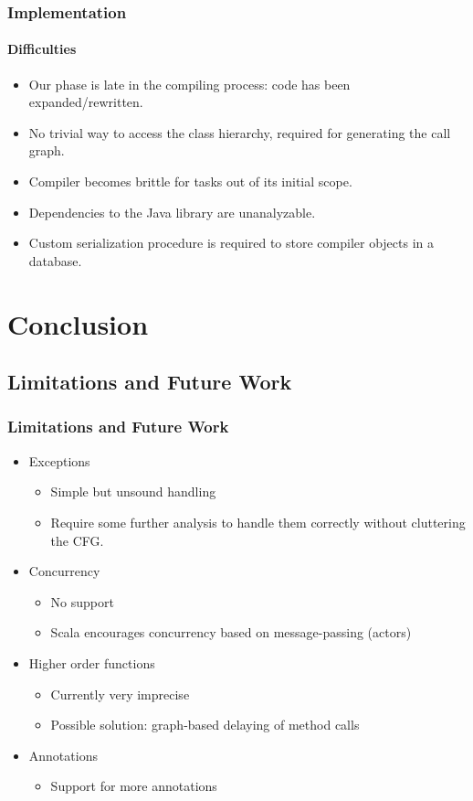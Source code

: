 \documentclass[hyperref={pdfpagelabels=false}]{beamer}
\begin{document}
\begin{frame}
    \frametitle{Implementation}
    \framesubtitle{Difficulties}
    \begin{itemize}
        \item Our phase is late in the compiling process: code has been
        expanded/rewritten.

        \item No trivial way to access the class hierarchy, required for
        generating the call graph.

        \item Compiler becomes brittle for tasks out of its initial scope.

        \item Dependencies to the Java library are unanalyzable.

        \item Custom serialization procedure is required to store compiler
        objects in a database.
    \end{itemize}

\end{frame}

\section{Conclusion}
\subsection{Limitations and Future Work}
\begin{frame}
\frametitle{Limitations and Future Work}
    \begin{itemize}
        \item Exceptions
        \begin{itemize}
            \item Simple but unsound handling
            \item Require some further analysis to handle them correctly without
cluttering the CFG.
        \end{itemize}
        \item Concurrency
        \begin{itemize}
            \item No support
            \item Scala encourages concurrency based on message-passing (actors)
        \end{itemize}
        \item Higher order functions
        \begin{itemize}
            \item Currently very imprecise
            \item Possible solution: graph-based delaying of method calls
        \end{itemize}
        \item Annotations
        \begin{itemize}
            \item Support for more annotations
        \end{itemize}
    \end{itemize}
\end{frame}
\end{document}

